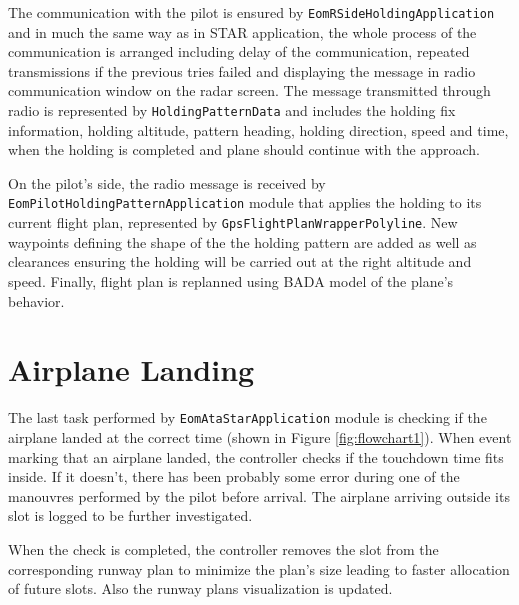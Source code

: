 The communication with the pilot is ensured by \texttt{EomRSideHoldingApplication} and in much the same way as in STAR application, the whole process of the communication is arranged including delay of the communication, repeated transmissions if the previous tries failed and displaying the message in radio communication window on the radar screen. The message transmitted through radio is represented by \texttt{HoldingPatternData} and includes the holding fix information, holding altitude, pattern heading, holding direction, speed and time, when the holding is completed and plane should continue with the approach.

On the pilot's side, the radio message is received by \texttt{EomPilotHoldingPattern\-Appli\-cation} module that applies the holding to its current flight plan, represented by \texttt{GpsFlight\-Plan\-WrapperPolyline}. New waypoints defining the shape of the the holding pattern are added as well as clearances ensuring the holding will be carried out at the right altitude and speed. Finally, flight plan is replanned using BADA model of the plane's behavior.

\section{Airplane Landing}

The last task performed by \texttt{EomAtaStar\-Application} module is checking if the airplane landed at the correct time (shown in Figure \ref{fig:flowchart1}). When event marking that an airplane landed, the controller checks if the touchdown time fits inside. If it doesn't, there has been probably some error during one of the manouvres performed by the pilot before arrival. The airplane arriving outside its slot is logged to be further investigated.

When the check is completed, the controller removes the slot from the corresponding runway plan to minimize the plan's size leading to faster allocation of future slots. Also the runway plans visualization is updated.

